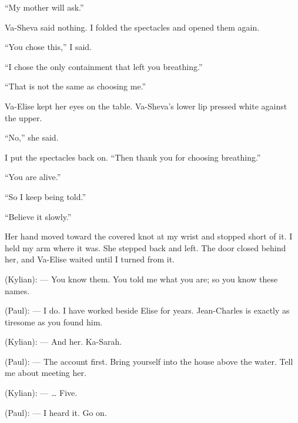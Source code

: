 ``My mother will ask.''\par

Va-Sheva said nothing. I folded the spectacles and opened them again.\par

``You chose this,'' I said.\par

``I chose the only containment that left you breathing.''\par

``That is not the same as choosing me.''\par

Va-Elise kept her eyes on the table. Va-Sheva's lower lip pressed white against the upper.\par

``No,'' she said.\par

I put the spectacles back on. ``Then thank you for choosing breathing.''\par

``You are alive.''\par

``So I keep being told.''\par

``Believe it slowly.''\par

Her hand moved toward the covered knot at my wrist and stopped short of it. I held my arm where it was. She stepped back and left. The door closed behind her, and Va-Elise waited until I turned from it.\par

\ornament

\begin{room}

(Kylian): --- You know them. You told me what you are; so you know these names.

(Paul): --- I do. I have worked beside Elise for years. Jean-Charles is exactly as tiresome as you found him.

(Kylian): --- And her. Ka-Sarah.

(Paul): --- The account first. Bring yourself into the house above the water. Tell me about meeting her.

(Kylian): --- \ldots{} Five.

(Paul): --- I heard it. Go on.

\end{room}

\ornament


